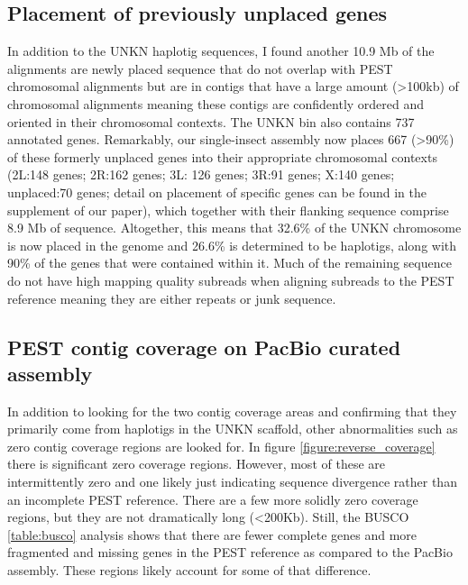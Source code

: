 \subsection{Placement of previously unplaced genes}\label{section:unkn}
\par{
In addition to the UNKN haplotig sequences, I found another 10.9 Mb of the alignments are newly placed sequence that do not overlap with PEST chromosomal alignments but are in contigs that have a large amount (>100kb) of chromosomal alignments meaning these contigs are confidently ordered and oriented in their chromosomal contexts. The UNKN bin also contains 737 annotated genes. Remarkably, our single-insect assembly now places 667 (>90\%) of these formerly unplaced genes into their appropriate chromosomal contexts (2L:148 genes; 2R:162 genes; 3L: 126 genes; 3R:91 genes; X:140 genes; unplaced:70 genes; detail on placement of specific genes can be found in the supplement of our paper\cite{singlemosquito}), which together with their flanking sequence comprise 8.9 Mb of sequence. Altogether, this means that 32.6\% of the UNKN chromosome is now placed in the genome and 26.6\% is determined to be haplotigs, along with 90\% of the genes that were contained within it. Much of the remaining sequence do not have high mapping quality subreads when aligning subreads to the PEST reference meaning they are either repeats or junk sequence.
}

\subsection{PEST contig coverage on PacBio curated assembly}

\par{
In addition to looking for the two contig coverage areas and confirming that they primarily come from haplotigs in the UNKN scaffold, other abnormalities such as zero contig coverage regions are looked for. In figure \ref{figure:reverse_coverage} there is significant zero coverage regions. However, most of these are intermittently zero and one likely just indicating sequence divergence rather than an incomplete PEST reference. There are a few more solidly zero coverage regions, but they are not dramatically long (<200Kb). Still, the BUSCO \ref{table:busco} analysis shows that there are fewer complete genes and more fragmented and missing genes in the PEST reference as compared to the PacBio assembly. These regions likely account for some of that difference.
}

